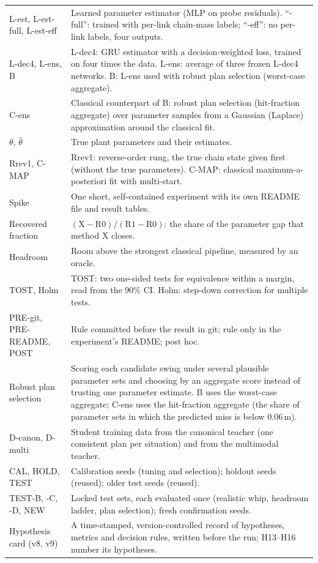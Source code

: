 \begin{table}[t]
\begin{tabular}{@{}p{2.7cm}p{14.4cm}@{}}
L-est, L-est-full, L-est-eff & Learned parameter estimator (MLP on probe residuals). ``-full'': trained with per-link chain-mass labels; ``-eff'': no per-link labels, four outputs. \\
L-dec4, L-ens, B & L-dec4: GRU estimator with a decision-weighted loss, trained on four times the data. L-ens: average of three frozen L-dec4 networks. B: L-ens used with robust plan selection (worst-case aggregate). \\
C-ens & Classical counterpart of B: robust plan selection (hit-fraction aggregate) over parameter samples from a Gaussian (Laplace) approximation around the classical fit. \\
$\theta$, $\hat\theta$ & True plant parameters and their estimates. \\
Rrev1, C-MAP & Rrev1: reverse-order rung, the true chain state given first (without the true parameters). C-MAP: classical maximum-a-posteriori fit with multi-start. \\
Spike & One short, self-contained experiment with its own README file and result tables. \\
Recovered fraction & $(\text{X}-\text{R0})/(\text{R1}-\text{R0})$: the share of the parameter gap that method X closes. \\
Headroom & Room above the strongest classical pipeline, measured by an oracle. \\
TOST, Holm & TOST: two one-sided tests for equivalence within a margin, read from the 90\% CI. Holm: step-down correction for multiple tests. \\
PRE-git, PRE-README, POST & Rule committed before the result in git; rule only in the experiment's README; post hoc. \\
Robust plan selection & Scoring each candidate swing under several plausible parameter sets and choosing by an aggregate score instead of trusting one parameter estimate. B uses the worst-case aggregate; C-ens uses the hit-fraction aggregate (the share of parameter sets in which the predicted miss is below 0.06\,m). \\
D-canon, D-multi & Student training data from the canonical teacher (one consistent plan per situation) and from the multimodal teacher. \\
CAL, HOLD, TEST & Calibration seeds (tuning and selection); holdout seeds (reused); older test seeds (reused). \\
TEST-B, -C, -D, NEW & Locked test sets, each evaluated once (realistic whip, headroom ladder, plan selection); fresh confirmation seeds. \\
Hypothesis card (v8, v9) & A time-stamped, version-controlled record of hypotheses, metrics and decision rules, written before the run; H13--H16 number its hypotheses. \\
\bottomrule
\end{tabular}
\end{table}
